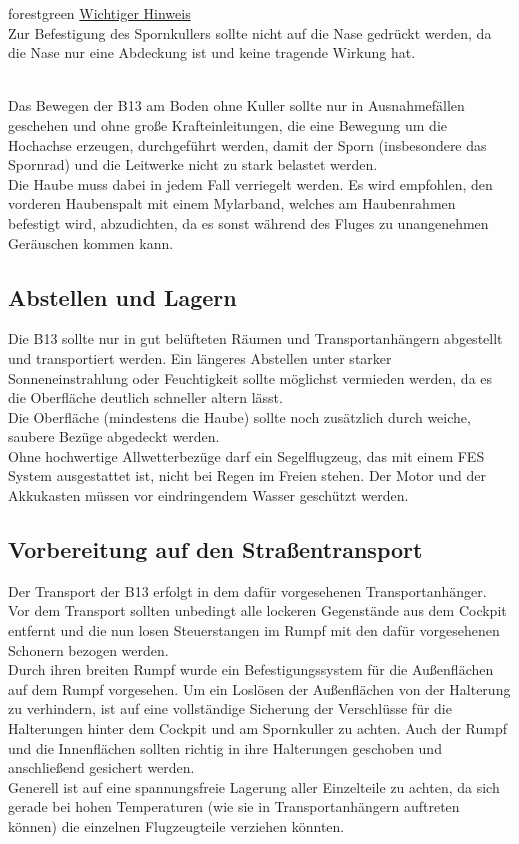 \begin{color}{forestgreen}
\large{\underline{Wichtiger Hinweis}}\\
Zur Befestigung des Spornkullers sollte nicht auf die Nase gedrückt werden, da die Nase nur eine Abdeckung ist und keine tragende Wirkung hat.
\end{color}\\
\newline
Das Bewegen der B13 am Boden ohne Kuller sollte nur in Ausnahmefällen geschehen und ohne große Krafteinleitungen, die eine Bewegung um die Hochachse erzeugen, durchgeführt werden, damit der Sporn (insbesondere das Spornrad) und die Leitwerke nicht zu stark belastet werden.\\
\newline
Die Haube muss dabei in jedem Fall verriegelt werden. Es wird empfohlen, den vorderen Haubenspalt mit einem Mylarband, welches am Haubenrahmen befestigt wird, abzudichten, da es sonst während des Fluges zu unangenehmen Geräuschen kommen kann. 

\subsection{Abstellen und Lagern}
Die B13 sollte nur in gut belüfteten Räumen und Transportanhängern abgestellt und transportiert werden. Ein längeres Abstellen unter starker Sonneneinstrahlung oder Feuchtigkeit sollte möglichst vermieden werden, da es die Oberfläche deutlich schneller altern lässt.\\
\newline
Die Oberfläche (mindestens die Haube) sollte noch zusätzlich durch weiche, saubere Bezüge abgedeckt werden. \\

Ohne hochwertige Allwetterbezüge darf ein Segelflugzeug, das mit einem FES System ausgestattet ist, nicht bei Regen im Freien stehen. Der Motor und der Akkukasten müssen vor eindringendem Wasser geschützt werden. 

\subsection{Vorbereitung auf den Straßentransport}
Der Transport der B13 erfolgt in dem dafür vorgesehenen Transportanhänger. Vor dem Transport sollten unbedingt alle lockeren Gegenstände aus dem Cockpit entfernt und die nun losen Steuerstangen im Rumpf mit den dafür vorgesehenen Schonern bezogen werden. \\
\newline
Durch ihren breiten Rumpf wurde ein Befestigungssystem für die Außenflächen auf dem Rumpf vorgesehen. Um ein Loslösen der Außenflächen von der Halterung zu verhindern, ist auf eine vollständige Sicherung der Verschlüsse für die Halterungen hinter dem Cockpit und am Spornkuller zu achten. Auch der Rumpf und die Innenflächen sollten richtig in ihre Halterungen geschoben und anschließend gesichert werden. \\
\newline
Generell ist auf eine spannungsfreie Lagerung aller Einzelteile zu achten, da sich gerade bei hohen Temperaturen (wie sie in Transportanhängern auftreten können)  die einzelnen Flugzeugteile verziehen könnten. 

